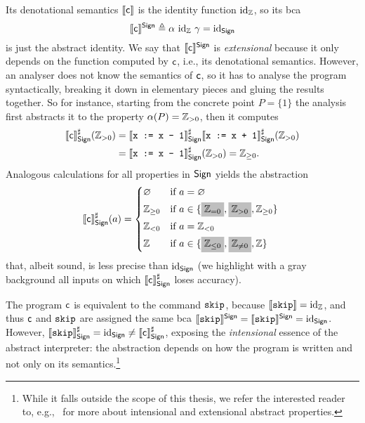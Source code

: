 \begin{example}
	Its denotational semantics $\llbracket\mathsf{c}\rrbracket$ is the identity function $\text{id}_{\mathbb{Z}}$, so its bca $$\llbracket\mathsf{c}\rrbracket^{\mathsf{Sign}} \triangleq \alpha~\text{id}_{\mathbb{Z}}~\gamma = \text{id}_{\mathsf{Sign}}$$
	is just the abstract identity. We say that $\llbracket\mathsf{c}\rrbracket^{\mathsf{Sign}}$ is \emph{extensional} because it only depends on the function computed by $\mathsf{c}$, i.e., its denotational semantics. However, an analyser does not know the semantics of $\mathsf{c}$, so it has to analyse the program syntactically, breaking it down in elementary pieces and gluing the results together. So for instance, starting from the concrete point $P = \{ 1 \}$ the analysis first abstracts it to the property $\alpha(P) = \mathbb{Z}_{> 0}$, then it computes
	\begin{align*}
		\llbracket\mathsf{c}\rrbracket^{\sharp}_{\mathsf{Sign}} (\mathbb{Z}_{> 0}) & = \llbracket\texttt{x := x - 1}\rrbracket^{\sharp}_{\mathsf{Sign}} \llbracket\texttt{x := x + 1}\rrbracket^{\sharp}_{\mathsf{Sign}} (\mathbb{Z}_{> 0}) \\
		                                             & = \llbracket\texttt{x := x - 1}\rrbracket^{\sharp}_{\mathsf{Sign}} (\mathbb{Z}_{> 0}) = \mathbb{Z}_{\ge 0} .
	\end{align*}
	Analogous calculations for all properties in $\mathsf{Sign}$ yields the abstraction
	\[
	\denot{\regc}^{\sharp}_{\Sign}(a) = \begin{cases*}
		\varnothing   & if $a = \varnothing$                                                                                     \\
		\setZ_{\ge 0} & if $a \in \{ \colorbox{lightgray}{$\setZ_{= 0}$}, \colorbox{lightgray}{$\setZ_{> 0}$}, \setZ_{\ge 0} \}$ \\
		\setZ_{< 0}   & if $a = \setZ_{< 0}$                                                                                     \\
		\setZ         & if $a \in \{ \colorbox{lightgray}{$\setZ_{\le 0}$}, \colorbox{lightgray}{$\setZ_{\neq 0}$}, \setZ \}$
	\end{cases*}
	\]
	that, albeit sound, is less precise than $\text{id}_{\mathsf{Sign}}$ (we highlight with a gray background all inputs on which $\llbracket\mathsf{c}\rrbracket^{\sharp}_{\mathsf{Sign}}$ loses accuracy).

	The program $\mathsf{c}$ is equivalent to the command $\texttt{skip}$, because $\llbracket\texttt{skip}\rrbracket=\text{id}_{\mathbb{Z}}$, and thus $\mathsf{c}$ and $\texttt{skip}$ are assigned the same bca $\llbracket\texttt{skip}\rrbracket^{\mathsf{Sign}} = \llbracket\texttt{skip}\rrbracket^{\mathsf{Sign}} =  \text{id}_{\mathsf{Sign}}$.
	However, $\llbracket\texttt{skip}\rrbracket^{\sharp}_{\mathsf{Sign}} = \text{id}_{\mathsf{Sign}} \neq \llbracket\mathsf{c}\rrbracket^{\sharp}_{\mathsf{Sign}}$, exposing the \emph{intensional} essence of the abstract interpreter: the abstraction depends on how the program is written and not only on its semantics.\footnote{While it falls outside the scope of this thesis, we refer the interested reader to, e.g.,~\cite{BGGGP19,BRZ22} for more about intensional and extensional abstract properties.}
\end{example}

